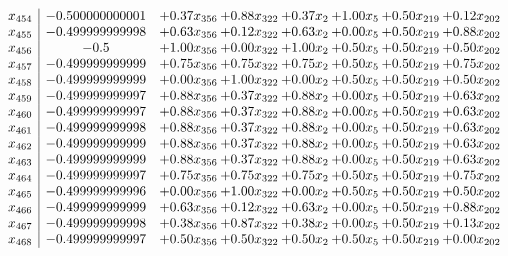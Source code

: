 \documentclass[8pt]{article}
\begin{document}
\[\begin{array}{c| c c@{\hskip 2pt} c@{\hskip 2pt} c@{\hskip 2pt} c@{\hskip 2pt} c@{\hskip 2pt} c@{\hskip 2pt} }
 x_{454}   &  -0.500000000001 & +  0.37 x_{356} & +  0.88 x_{322} & +  0.37 x_{2} & +  1.00 x_{5} & +  0.50 x_{219} & +  0.12 x_{202}\\
 x_{455}   &  -0.499999999998 & +  0.63 x_{356} & +  0.12 x_{322} & +  0.63 x_{2} & +  0.00 x_{5} & +  0.50 x_{219} & +  0.88 x_{202}\\
 x_{456}   &  -0.5 & +  1.00 x_{356} & +  0.00 x_{322} & +  1.00 x_{2} & +  0.50 x_{5} & +  0.50 x_{219} & +  0.50 x_{202}\\
 x_{457}   &  -0.499999999999 & +  0.75 x_{356} & +  0.75 x_{322} & +  0.75 x_{2} & +  0.50 x_{5} & +  0.50 x_{219} & +  0.75 x_{202}\\
 x_{458}   &  -0.499999999999 & +  0.00 x_{356} & +  1.00 x_{322} & +  0.00 x_{2} & +  0.50 x_{5} & +  0.50 x_{219} & +  0.50 x_{202}\\
 x_{459}   &  -0.499999999997 & +  0.88 x_{356} & +  0.37 x_{322} & +  0.88 x_{2} & +  0.00 x_{5} & +  0.50 x_{219} & +  0.63 x_{202}\\
 x_{460}   &  -0.499999999997 & +  0.88 x_{356} & +  0.37 x_{322} & +  0.88 x_{2} & +  0.00 x_{5} & +  0.50 x_{219} & +  0.63 x_{202}\\
 x_{461}   &  -0.499999999998 & +  0.88 x_{356} & +  0.37 x_{322} & +  0.88 x_{2} & +  0.00 x_{5} & +  0.50 x_{219} & +  0.63 x_{202}\\
 x_{462}   &  -0.499999999999 & +  0.88 x_{356} & +  0.37 x_{322} & +  0.88 x_{2} & +  0.00 x_{5} & +  0.50 x_{219} & +  0.63 x_{202}\\
 x_{463}   &  -0.499999999999 & +  0.88 x_{356} & +  0.37 x_{322} & +  0.88 x_{2} & +  0.00 x_{5} & +  0.50 x_{219} & +  0.63 x_{202}\\
 x_{464}   &  -0.499999999997 & +  0.75 x_{356} & +  0.75 x_{322} & +  0.75 x_{2} & +  0.50 x_{5} & +  0.50 x_{219} & +  0.75 x_{202}\\
 x_{465}   &  -0.499999999996 & +  0.00 x_{356} & +  1.00 x_{322} & +  0.00 x_{2} & +  0.50 x_{5} & +  0.50 x_{219} & +  0.50 x_{202}\\
 x_{466}   &  -0.499999999999 & +  0.63 x_{356} & +  0.12 x_{322} & +  0.63 x_{2} & +  0.00 x_{5} & +  0.50 x_{219} & +  0.88 x_{202}\\
 x_{467}   &  -0.499999999998 & +  0.38 x_{356} & +  0.87 x_{322} & +  0.38 x_{2} & +  0.00 x_{5} & +  0.50 x_{219} & +  0.13 x_{202}\\
 x_{468}   &  -0.499999999997 & +  0.50 x_{356} & +  0.50 x_{322} & +  0.50 x_{2} & +  0.50 x_{5} & +  0.50 x_{219} & +  0.00 x_{202}\\

\end{array}\]
\end{document}

